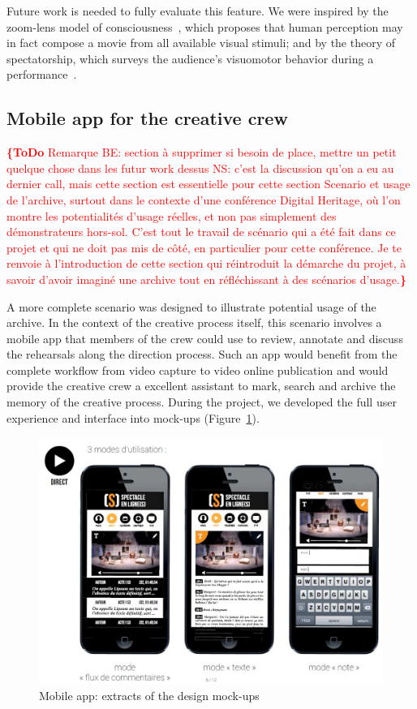 \documentclass[conference]{IEEEtran}
\newcommand{\todo}[1]{\noindent\textcolor{red}{{\bf \{ToDo} #1{\bf \}}}}
\begin{document}
Future work is needed to fully evaluate this feature. We were inspired by the zoom-lens model of consciousness~\cite{Eriksen86}, 
which proposes  that human perception  may in fact compose a movie from all available visual  stimuli; and by the theory 
of spectatorship, which surveys the audience's visuomotor behavior  during a performance~\cite{Bennett97}.   

\subsection{Mobile app for the creative crew} 
\todo{Remarque BE: section à supprimer si besoin de place, mettre un petit quelque chose dans les futur work dessus
NS: c'est la discussion qu'on a eu au dernier call, mais cette section est essentielle pour cette section Scenario et usage de l'archive, surtout dans le contexte d'une conférence Digital Heritage, où l'on montre les potentialités d'usage réelles, et non pas simplement des démonstrateurs hors-sol. C'est tout le travail de scénario qui a été fait dans ce projet et qui ne doit pas mis de côté, en particulier pour cette conférence. Je te renvoie à l'introduction de cette section qui réintroduit la démarche du projet, à savoir d'avoir imaginé une archive tout en réfléchissant à des scénarios d'usage.}

A more complete scenario was designed to illustrate potential usage of the archive. In the context of the creative process itself, this scenario involves a mobile app that members of the crew could use to review, annotate and discuss the rehearsals along the direction process. Such an app would benefit from the complete workflow from video capture to video online publication and would provide the creative crew a excellent assistant to mark, search and archive the memory of the creative process. During the project, we developed the full user experience and interface into mock-ups (Figure~\ref{fig:mobileapp}).

\begin{figure}[htb!]
  \centering
  \includegraphics[width=\columnwidth]{mobileapp}
  \caption{Mobile app: extracts of the design mock-ups}
  \label{fig:mobileapp}
\end{figure}
\end{document}

